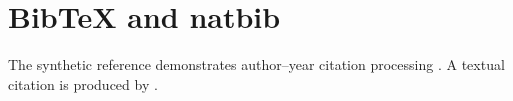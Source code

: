 \documentclass{article}
\begin{document}
\section*{BibTeX and natbib}
The synthetic reference demonstrates author--year citation processing
\citep{smith2020}. A textual citation is produced by \citet{jones2021}.



\end{document}
